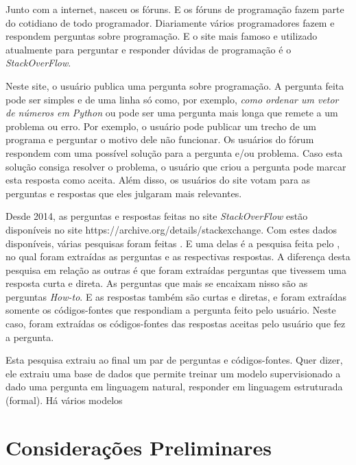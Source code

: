 Junto com a internet, nasceu os fóruns. E os fóruns de programação fazem parte do cotidiano de todo programador. Diariamente vários programadores fazem e respondem perguntas sobre programação. E o site mais famoso e utilizado atualmente para perguntar e responder dúvidas de programação é o \textit{StackOverFlow}. 

Neste site, o usuário publica uma pergunta sobre programação. A pergunta feita pode ser simples e de uma linha só como, por exemplo, \textit{como ordenar um vetor de números em Python} ou pode ser uma pergunta mais longa que remete a um problema ou erro. Por exemplo, o usuário pode publicar um trecho de um programa e perguntar o motivo dele não funcionar. Os usuários do fórum respondem com uma possível solução para a pergunta e/ou problema. Caso esta solução consiga resolver o problema, o usuário que criou a pergunta pode marcar esta resposta como aceita. Além disso, os usuários do site votam para as perguntas e respostas que eles julgaram mais relevantes. 

Desde 2014, as perguntas e respostas feitas no site \textit{StackOverFlow} estão disponíveis no site https://archive.org/details/stackexchange. Com estes dados disponíveis, várias pesquisas foram feitas . E uma delas é a pesquisa feita pelo \cite{yao-2018}, no qual foram extraídas as perguntas e as respectivas respostas. A diferença desta pesquisa em relação as outras é que foram extraídas perguntas que tivessem uma resposta curta e direta. As perguntas que mais se encaixam nisso são as perguntas \textit{How-to}. E as respostas também são curtas e diretas, e foram extraídas somente os códigos-fontes que respondiam a pergunta feito pelo usuário. Neste caso, foram extraídas os códigos-fontes das respostas aceitas pelo usuário que fez a pergunta. 

Esta pesquisa \cite{yao-2018} extraiu ao final um par de perguntas e códigos-fontes. Quer dizer, ele extraiu uma base de dados que permite treinar um modelo supervisionado a dado uma pergunta em linguagem natural, responder em linguagem estruturada (formal). Há vários modelos 










\section{Considerações Preliminares}
\label{sec:consideracoes_preliminares}


